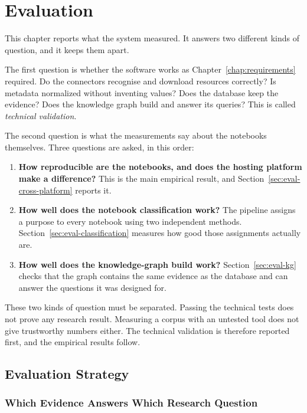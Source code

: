 \chapter{Evaluation}
\label{chap:evaluation}

This chapter reports what the system measured. It answers two different kinds of question, and it keeps them apart.

The first question is whether the software works as Chapter~\ref{chap:requirements} required. Do the connectors recognise and download resources correctly? Is metadata normalized without inventing values? Does the database keep the evidence? Does the knowledge graph build and answer its queries? This is called \emph{technical validation}.

The second question is what the measurements say about the notebooks themselves. Three questions are asked, in this order:

\begin{enumerate}[leftmargin=*]
\item \textbf{How reproducible are the notebooks, and does the hosting platform make a difference?} This is the main empirical result, and Section~\ref{sec:eval-cross-platform} reports it.
\item \textbf{How well does the notebook classification work?} The pipeline assigns a purpose to every notebook using two independent methods. Section~\ref{sec:eval-classification} measures how good those assignments actually are.
\item \textbf{How well does the knowledge-graph build work?} Section~\ref{sec:eval-kg} checks that the graph contains the same evidence as the database and can answer the questions it was designed for.
\end{enumerate}

These two kinds of question must be separated. Passing the technical tests does not prove any research result. Measuring a corpus with an untested tool does not give trustworthy numbers either. The technical validation is therefore reported first, and the empirical results follow.

\section{Evaluation Strategy}
\label{sec:eval-strategy}

\subsection{Which Evidence Answers Which Research Question}

